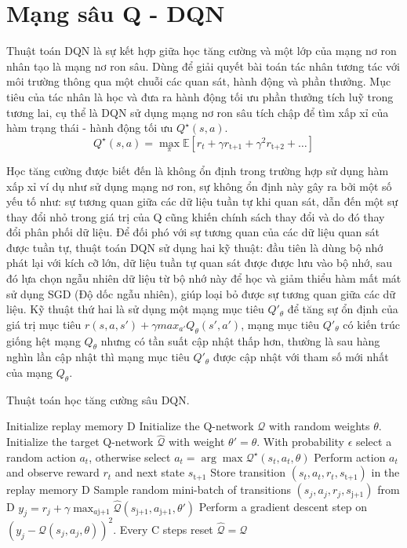 \documentclass{uetgraduation}
\begin{document}
\section{Mạng sâu Q - DQN}
Thuật toán DQN là sự kết hợp giữa học tăng cường và một lớp của mạng nơ ron nhân tạo là mạng nơ ron sâu. Dùng để giải quyết bài toán tác nhân tương tác với môi trường thông qua một
chuỗi các quan sát, hành động và phần thưởng. Mục tiêu của tác nhân là học và đưa ra hành động tối ưu phần thưởng tích luỹ trong tương lai, cụ thể là DQN sử dụng mạng nơ ron sâu tích chập
để tìm xấp xỉ của hàm trạng thái - hành động tối ưu $Q^\star (s, a)$.
\begin{equation}
    Q^\star (s, a) = \max_{\pi} \mathbb{E} [r_t + \gamma r_\text{t+1} + \gamma^2 r_\text{t+2} + \dots]
\end{equation}

Học tăng cường được biết đến là không ổn định trong trường hợp sử dụng hàm xấp xỉ ví dụ như sử dụng mạng nơ ron, sự không ổn định này gây ra bởi một số yếu tố như:
sự tương quan giữa các dữ liệu tuần tự khi quan sát, dẫn đến một sự thay đổi nhỏ trong giá trị của Q cũng khiến chính sách thay đổi và do đó thay đổi phân phối dữ liệu. Để đối phó với sự
tương quan của các dữ liệu quan sát được tuần tự, thuật toán DQN sử dụng hai kỹ thuật: đầu tiên là dùng bộ nhớ phát lại với kích cỡ lớn, dữ liệu tuần tự quan sát được được lưu vào bộ nhớ, sau đó lựa chọn
ngẫu nhiên dữ liệu từ bộ nhớ này để học và giảm thiểu hàm mất mát sử dụng SGD (Độ dốc ngẫu nhiên), giúp loại bỏ được sự tương quan giữa các dữ liệu. Kỹ thuật thứ hai là
sử dụng một mạng mục tiêu $Q'_\theta$ để tăng sự ổn định của giá trị mục tiêu $r(s, a, s') + \gamma max_{a'} Q_\theta (s', a')$, mạng mục tiêu $Q'_\theta$ có kiến trúc giống hệt mạng
$Q_\theta$ nhưng có tần suất cập nhật thấp hơn, thường là sau hàng nghìn lần cập nhật thì mạng mục tiêu $Q'_\theta$ được cập nhật với tham số mới nhất của mạng $Q_\theta$.
\begin{algorithm}
    \caption{Thuật toán học tăng cường sâu DQN.}\label{alg:dqn_2}
    \begin{algorithmic}[1]
    \State Initialize replay memory D
    \State Initialize the Q-network $\mathcal{Q}$ with random weights $\theta$.
    \State Initialize the target Q-network $\hat{\mathcal{Q}}$ with weight $\theta' = \theta$.
        \State With probability $\epsilon$ select a random action $a_t$, otherwise select $a_t = \arg \max \mathcal{Q}^\star (s_t, a_t, \theta)$
        \State Perform action $a_t$ and observe reward $r_t$ and next state $s_\text{t+1}$
        \State Store transition $(s_t,a_t,r_t,s_\text{t+1})$ in the replay memory D
        \State Sample random mini-batch of transitions $(s_j,a_j,r_j,s_\text{j+1})$ from D
        \State $y_j = r_j + \gamma \max_{a\text{j+1}} \hat{\mathcal{Q}} (s_\text{j+1}, a_\text{j+1}, \theta')$
        \State Perform a gradient descent step on $(y_j - \mathcal{Q} (s_j, a_j, \theta))^2$.
        \State Every C steps reset $\hat{\mathcal{Q}} = \mathcal{Q}$
    \EndFor
\end{algorithmic}
\end{algorithm}
\end{document}
